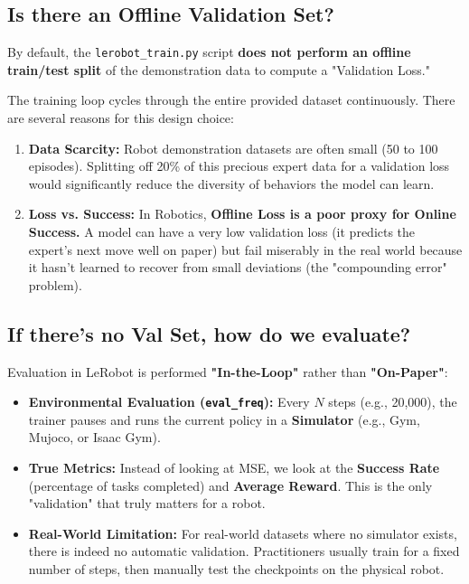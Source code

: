 \documentclass[11pt,a4paper]{article}
\begin{document}
\subsection{Is there an Offline Validation Set?}
By default, the \texttt{lerobot\_train.py} script \textbf{does not perform an offline train/test split} of the demonstration data to compute a "Validation Loss." 

The training loop cycles through the entire provided dataset continuously. There are several reasons for this design choice:
\begin{enumerate}
    \item \textbf{Data Scarcity:} Robot demonstration datasets are often small (50 to 100 episodes). Splitting off 20\% of this precious expert data for a validation loss would significantly reduce the diversity of behaviors the model can learn.
    \item \textbf{Loss vs. Success:} In Robotics, \textbf{Offline Loss is a poor proxy for Online Success.} A model can have a very low validation loss (it predicts the expert's next move well on paper) but fail miserably in the real world because it hasn't learned to recover from small deviations (the "compounding error" problem).
\end{enumerate}

\subsection{If there's no Val Set, how do we evaluate?}
Evaluation in LeRobot is performed \textbf{"In-the-Loop"} rather than \textbf{"On-Paper"}:
\begin{itemize}
    \item \textbf{Environmental Evaluation (\texttt{eval\_freq}):} Every $N$ steps (e.g., 20,000), the trainer pauses and runs the current policy in a \textbf{Simulator} (e.g., Gym, Mujoco, or Isaac Gym).
    \item \textbf{True Metrics:} Instead of looking at MSE, we look at the \textbf{Success Rate} (percentage of tasks completed) and \textbf{Average Reward}. This is the only "validation" that truly matters for a robot.
    \item \textbf{Real-World Limitation:} For real-world datasets where no simulator exists, there is indeed no automatic validation. Practitioners usually train for a fixed number of steps, then manually test the checkpoints on the physical robot.
\end{itemize}
\end{document}
